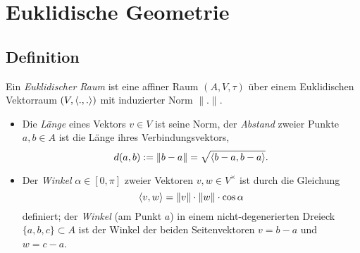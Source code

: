 \section{Euklidische Geometrie}
\subsection{Definition}
\begin{Definition}
	Ein \emph{Euklidischer Raum} ist eine affiner Raum $ (A,V,\tau) $ über einem Euklidischen Vektorraum $ (V,\langle .,. \rangle) $ mit induzierter Norm $ \|.\| $.
		\begin{itemize}
			\item Die \emph{Länge} eines Vektors $ v\in V $ ist seine Norm, der \emph{Abstand} zweier Punkte $ a,b\in A $ ist die Länge ihres Verbindungsvektors,
				\[ d(a,b) := \|b-a\| = \sqrt{\langle b-a,b-a \rangle}. \]
			\item Der \emph{Winkel} $ \alpha\in [0,\pi] $ zweier Vektoren $ v,w\in V^\times $ ist durch die Gleichung
				\[ \langle v,w \rangle = \|v\|\cdot \|w\|\cdot \cos \alpha \]
			definiert; der \emph{Winkel} (am Punkt $ a $) in einem nicht-degenerierten Dreieck $ \{a,b,c\} \subset A$ ist der Winkel der beiden Seitenvektoren $ v=b-a $ und $ w = c-a $.
		\end{itemize}
\end{Definition}

